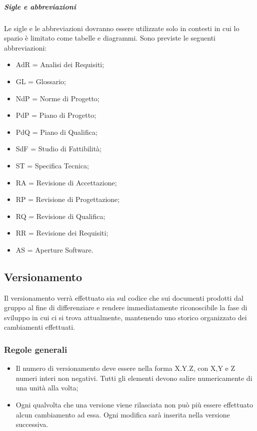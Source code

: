 \subparagraph{Sigle e abbreviazioni \\}
\label{5.5}
Le sigle e le abbreviazioni dovranno essere utilizzate solo in contesti in cui lo spazio è limitato come tabelle e diagrammi. Sono previste le seguenti abbreviazioni:
\begin{itemize}
\item AdR = Analisi dei Requisiti;
\item GL = Glossario;
\item NdP = Norme di Progetto;
\item PdP = Piano di Progetto;
\item PdQ = Piano di Qualifica;
\item SdF = Studio di Fattibilità;
\item ST = Specifica Tecnica;
\item RA = Revisione di Accettazione;
\item RP = Revisione di Progettazione;
\item RQ = Revisione di Qualifica;
\item RR = Revisione dei Requisiti;
\item AS = Aperture Software.
\end{itemize}


\newpage
\subsection{Versionamento}
\label{6.0}
Il versionamento verrà effettuato sia sul codice che sui documenti prodotti dal gruppo al fine di differenziare e rendere immediatamente riconoscibile la fase di sviluppo in cui ci si trova attualmente, mantenendo uno storico organizzato dei cambiamenti effettuati.

\subsubsection{Regole generali}
\label{6.1}
\begin{itemize}
\item Il numero di versionamento deve essere nella forma X.Y.Z, con X,Y e Z numeri interi non negativi. Tutti gli elementi devono salire numericamente di una unità alla volta;
\item Ogni qualvolta che una versione viene rilasciata non può più essere effettuato alcun cambiamento ad essa. Ogni modifica sarà inserita nella versione successiva.
\end{itemize}

